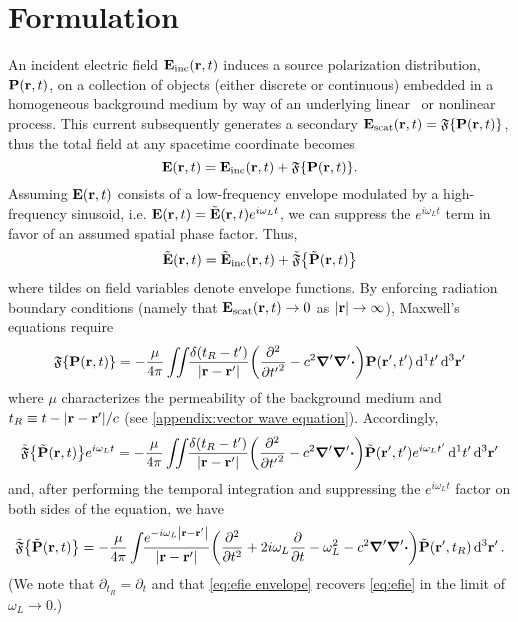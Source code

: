 \section{Formulation}

An incident electric field $\vb{E}_\text{inc}(\vb{r}, t)$ induces a source polarization distribution, $\vb{P}(\vb{r}, t)$, on a collection of objects (either discrete or continuous) embedded in a homogeneous background medium by way of an underlying linear~\cite{} or nonlinear~\cite{Glosser2017} process.
This current subsequently generates a secondary $\vb{E}_\text{scat}(\vb{r}, t) = \mathfrak{F}\qty{\vb{P}(\vb{r}, t)}$, thus the total field at any spacetime coordinate becomes
\begin{equation}
  \vb{E}(\vb{r}, t) = \vb{E}_\text{inc}(\vb{r}, t) + \mathfrak{F}\qty{\vb{P}(\vb{r}, t)}.
\end{equation}
Assuming $\vb{E}(\vb{r}, t)$ consists of a low-frequency envelope modulated by a high-frequency sinusoid, i.e. $\vb{E}(\vb{r}, t) = \tilde{\vb{E}}(\vb{r}, t) e^{i \omega_L t}$, we can suppress the $e^{i \omega_L t}$ term in favor of an assumed spatial phase factor. 
Thus,
\begin{equation}
  \tilde{\vb{E}}(\vb{r}, t) = \tilde{\vb{E}}_\text{inc}(\vb{r}, t) + \tilde{\mathfrak{F}}\qty{\tilde{\vb{P}}(\vb{r}, t)}
\end{equation}
where tildes on field variables denote envelope functions.
By enforcing radiation boundary conditions (namely that $\vb{E}_\text{scat}(\vb{r}, t) \to 0$ as $\abs{\vb{r}} \to \infty$), Maxwell's equations require
\begin{equation}
  \mathfrak{F}\qty{\vb{P}(\vb{r}, t)} = -\frac{\mu}{4\pi} \iint_{} \kern0.1em \frac{\delta(t_R - t')}{\abs{\vb{r} - \vb{r}'}} \qty(\pdv[2]{{t'}} - c^2 \grad' \grad'\boldsymbol{\cdot}) \vb{P}(\vb{r}', t') \dd[1]{t'} \dd[3]{\vb{r}'}
  \label{eq:efie}
\end{equation}
where $\mu$ characterizes the permeability of the background medium and $t_R \equiv t - \abs{\vb{r} - \vb{r}'}/c$ (see \cref{appendix:vector wave equation}).
Accordingly,
\begin{equation}
  \tilde{\mathfrak{F}}\qty{\tilde{\vb{P}}(\vb{r}, t)}e^{i \omega_L t} = -\frac{\mu}{4\pi} \iint_{} \kern0.1em \frac{\delta(t_R - t')}{\abs{\vb{r} - \vb{r}'}} \qty(\pdv[2]{{t'}} - c^2 \grad' \grad'\boldsymbol{\cdot}) \tilde{\vb{P}}(\vb{r}', t') e^{i \omega_L t'} \dd[1]{t'} \dd[3]{\vb{r}'}
  \label{eq:efie envelope}
\end{equation}
and, after performing the temporal integration and suppressing the $e^{i \omega_L t}$ factor on both sides of the equation, we have
\begin{equation}
  \tilde{\mathfrak{F}}\qty{\tilde{\vb{P}}(\vb{r}, t)} = -\frac{\mu}{4\pi} \int_{} \kern0.1em \frac{e^{- i \omega_L \abs{\vb{r} - \vb{r}'}}}{\abs{\vb{r} - \vb{r}'}} \qty(\pdv[2]{t} + 2 i \omega_L \pdv{t} - \omega_L^2 - c^2 \grad' \grad'\boldsymbol{\cdot}) \tilde{\vb{P}}(\vb{r}', t_R) \dd[3]{\vb{r}'}.
  \label{eq:efie envelope}
\end{equation}
(We note that $\partial_{t_R} = \partial_{t}$ and that \cref{eq:efie envelope} recovers \cref{eq:efie} in the limit of $\omega_L \to 0$.)

